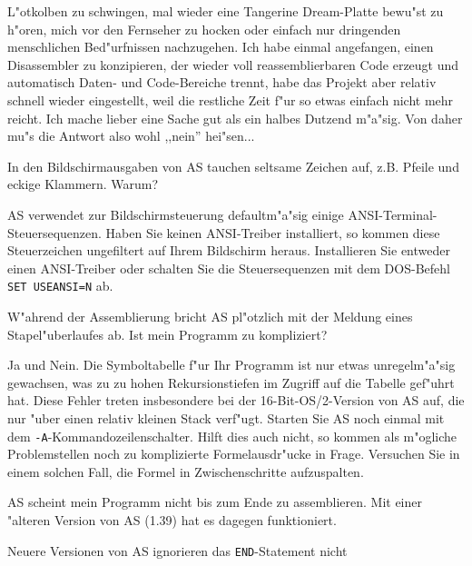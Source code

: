 \documentclass[12pt,a4paper,twoside]{report}
\newcommand{\tty}[1]{{\tt #1}}
\newcommand{\asname}{AS}
\begin{document}
\begin{description}
{         L"otkolben zu schwingen, mal wieder eine Tangerine Dream-Platte
         bewu"st zu h"oren, mich vor den Fernseher zu hocken oder einfach
         nur dringenden menschlichen Bed"urfnissen nachzugehen.  Ich habe
         einmal angefangen, einen Disassembler zu konzipieren, der wieder
         voll reassemblierbaren Code erzeugt und automatisch Daten- und
         Code-Bereiche trennt, habe das Projekt aber relativ schnell wieder
         eingestellt, weil die restliche Zeit f"ur so etwas einfach nicht
         mehr reicht.  Ich mache lieber eine Sache gut als ein halbes
         Dutzend m"a"sig.  Von daher mu"s die Antwort also wohl ,,nein''
         hei"sen...}
\vspace{0.3cm}
\item[F:]{In den Bildschirmausgaben von \asname{} tauchen seltsame Zeichen auf,
          z.B. Pfeile und eckige Klammern.  Warum?}
\item[A:]{\asname{} verwendet zur Bildschirmsteuerung defaultm"a"sig einige
          ANSI-Terminal-Steuersequenzen.  Haben Sie keinen ANSI-Treiber
	  installiert, so kommen diese Steuerzeichen ungefiltert auf
	  Ihrem Bildschirm heraus.  Installieren Sie entweder einen
	  ANSI-Treiber oder schalten Sie die Steuersequenzen mit dem
	  DOS-Befehl \tty{SET USEANSI=N} ab.}
\vspace{0.3cm}
\item[F:]{W"ahrend der Assemblierung bricht \asname{} pl"otzlich mit der
          Meldung eines Stapel"uberlaufes ab.  Ist mein Programm zu
	  kompliziert?}
\item[A:]{Ja und Nein.  Die Symboltabelle f"ur Ihr Programm ist nur
          etwas unregelm"a"sig gewachsen, was zu zu hohen Rekursionstiefen
	  im Zugriff auf die Tabelle gef"uhrt hat.  Diese Fehler treten
	  insbesondere bei der 16-Bit-OS/2-Version von \asname{} auf, die nur
	  "uber einen relativ kleinen Stack verf"ugt.  Starten Sie \asname{} noch
	  einmal mit dem \tty{-A}-Kommandozeilenschalter.  Hilft dies auch
          nicht, so kommen als m"ogliche Problemstellen noch zu komplizierte
          Formelausdr"ucke in Frage.  Versuchen Sie in einem solchen Fall,
          die Formel in Zwischenschritte aufzuspalten.}
\vspace{0.3cm}
\item[F:]{\asname{} scheint mein Programm nicht bis zum Ende zu assemblieren.
          Mit einer "alteren Version von \asname{} (1.39) hat es dagegen
	  funktioniert.}
\item[A:]{Neuere Versionen von \asname{} ignorieren das \tty{END}-Statement nicht
}
\end{description}
\end{document}
